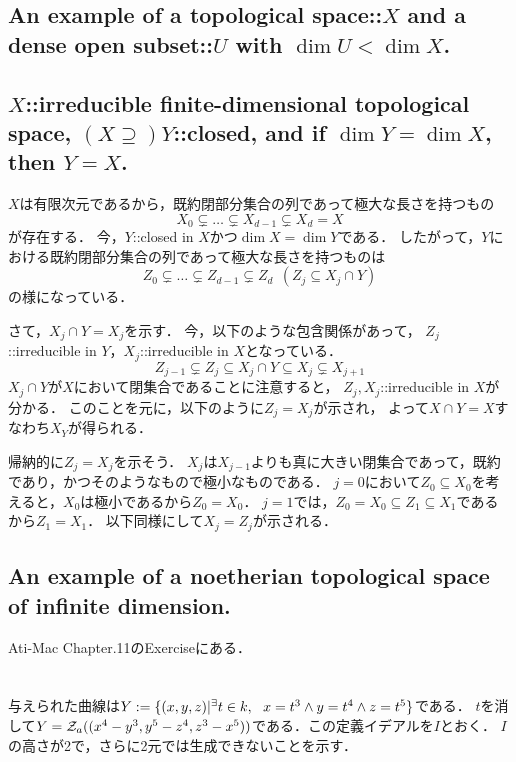\documentclass[a4paper]{jarticle}
\begin{document}
    \subsection{An example of a topological space::$X$ and a dense open subset::$U$ with $\dim U <\dim X$.}

    \subsection{$X$::irreducible finite-dimensional topological space, $(X \supseteq) Y$::closed, and if $\dim Y = \dim X$, then $Y = X$.}
    $X$は有限次元であるから，既約閉部分集合の列であって極大な長さを持つもの
    \[ X_0 \subsetneq \dots \subsetneq X_{d-1} \subsetneq X_d=X \]が存在する．
    今，$Y$::closed in $X$かつ$\dim X=\dim Y$である．
    したがって，$Y$における既約閉部分集合の列であって極大な長さを持つものは
    \[ Z_0 \subsetneq \dots \subsetneq Z_{d-1} \subsetneq Z_d ~~ (Z_j \subseteq X_j \cap Y) \]
    の様になっている．

    さて，$X_j \cap Y=X_j$を示す．
    今，以下のような包含関係があって，
    $Z_j$::irreducible in $Y$，$X_j$::irreducible in $X$となっている．
    \[ Z_{j-1} \subsetneq Z_j \subseteq X_j \cap Y \subseteq X_j \subsetneq X_{j+1} \]
    $X_j \cap Y$が$X$において閉集合であることに注意すると，
    $Z_j, X_j$::irreducible in $X$が分かる．
    このことを元に，以下のように$Z_j=X_j$が示され，
    よって$X \cap Y=X$すなわち$X_Y$が得られる．

    帰納的に$Z_j=X_j$を示そう．
    $X_j$は$X_{j-1}$よりも真に大きい閉集合であって，既約であり，かつそのようなもので極小なものである．
    $j=0$において$Z_0 \subseteq X_0$を考えると，$X_0$は極小であるから$Z_0=X_0$．
    $j=1$では，$Z_0=X_0 \subseteq Z_1 \subseteq X_1$であるから$Z_1=X_1$．
    以下同様にして$X_j=Z_j$が示される．

    \subsection{An example of a noetherian topological space of infinite dimension.}
    Ati-Mac Chapter.11のExerciseにある．

\section{} %
    与えられた曲線は$Y:=\{(x,y,z) | {}^{\exists} t \in k,~~ x=t^3 \land y=t^4 \land z=t^5\}$である．
    $t$を消して$Y=\mathcal{Z}_a((x^4-y^3, y^5-z^4, z^3-x^5))$である．この定義イデアルを$I$とおく．
    $I$の高さが2で，さらに2元では生成できないことを示す．
\end{document}
